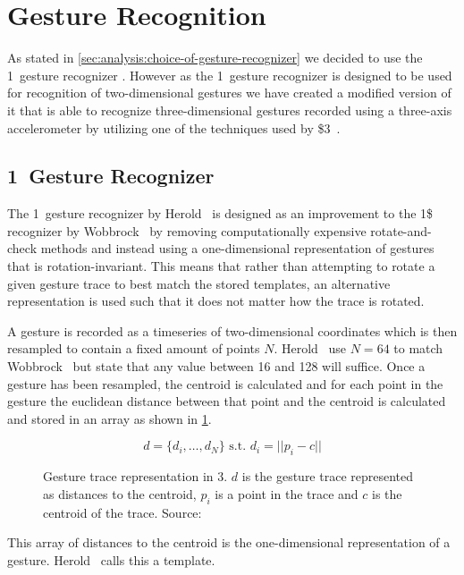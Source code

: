 \section{Gesture Recognition}
\label{sec:design:gesture-recognition}

As stated in \cref{sec:analysis:choice-of-gesture-recognizer} we decided to use the 1\textcent~gesture recognizer \cite{herold20121}.
However as the 1\textcent~gesture recognizer is designed to be used for recognition of two-dimensional gestures we have created a modified version of it that is able to recognize three-dimensional gestures recorded using a three-axis accelerometer by utilizing one of the techniques used by \$3~\cite{three-dollar}.

\subsection{1\textcent~Gesture Recognizer}
The 1\textcent~gesture recognizer by Herold \etal~is designed as an improvement to the 1\$ recognizer \cite{wobbrock2007gestures} by Wobbrock \etal~by removing computationally expensive rotate-and-check methods and instead using a one-dimensional representation of gestures that is rotation-invariant.
This means that rather than attempting to rotate a given gesture trace to best match the stored templates, an alternative representation is used such that it does not matter how the trace is rotated.

A gesture is recorded as a timeseries of two-dimensional coordinates which is then resampled to contain a fixed amount of points $N$.
Herold \etal~use $N = 64$ to match Wobbrock \etal~but state that any value between 16 and 128 will suffice.
Once a gesture has been resampled, the centroid is calculated and for each point in the gesture the euclidean distance between that point and the centroid is calculated and stored in an array as shown in \cref{eq:one-cent-trace-duplicate}.

\begin{figure}[h]
\[ d = \{d_i,\ldots,d_N\} \text{ s.t. } d_i=||p_i-c|| \]
\caption{Gesture trace representation in 3\textcent. $d$ is the gesture trace represented as distances to the centroid, $p_i$ is a point in the trace and $c$ is the centroid of the trace. Source:~\cite{herold20121}}
\label{eq:one-cent-trace-duplicate}
\end{figure}

This array of distances to the centroid is the one-dimensional representation of a gesture. Herold \etal~calls this a template.

